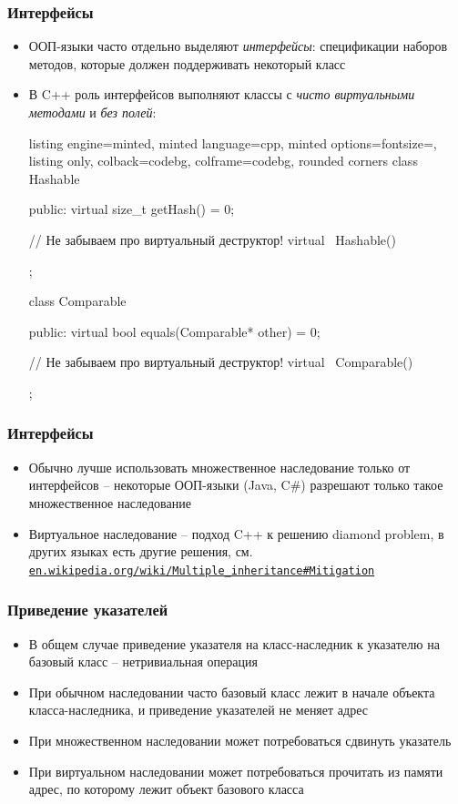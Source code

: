\documentclass[10pt]{beamer}
\begin{document}
\begin{frame}[fragile]
\frametitle{Интерфейсы}
\begin{itemize}
\item ООП-языки часто отдельно выделяют \textit{интерфейсы}: спецификации наборов методов, которые должен поддерживать некоторый класс
\pause
\item В C++ роль интерфейсов выполняют классы с \textit{чисто виртуальными методами} и \textit{без полей}:
\begin{tcblisting}{listing engine=minted, minted language=cpp, minted options={fontsize=\scriptsize}, listing only, colback=codebg, colframe=codebg, rounded corners}
class Hashable {
public:
  virtual size_t getHash() = 0;

  // Не забываем про виртуальный деструктор!
  virtual ~Hashable() {}
};

class Comparable {
public:
  virtual bool equals(Comparable* other) = 0;

  // Не забываем про виртуальный деструктор!
  virtual ~Comparable() {}
};
\end{tcblisting}
\end{itemize}
\end{frame}

\begin{frame}[fragile]
\frametitle{Интерфейсы}
\begin{itemize}
\item Обычно лучше использовать множественное наследование только от интерфейсов -- некоторые ООП-языки (Java, C\#) разрешают только такое множественное наследование
\pause
\item Виртуальное наследование -- подход C++ к решению diamond problem, в других языках есть другие решения, см. \href{https://en.wikipedia.org/wiki/Multiple\_inheritance\#Mitigation}{\nolinkurl{en.wikipedia.org/wiki/Multiple\_inheritance\#Mitigation}}
\end{itemize}
\end{frame}

\begin{frame}[fragile]
\frametitle{Приведение указателей}
\begin{itemize}
\item В общем случае приведение указателя на класс-наследник к указателю на базовый класс -- нетривиальная операция
\pause
\item При обычном наследовании часто базовый класс лежит в начале объекта класса-наследника, и приведение указателей не меняет адрес
\pause
\item При множественном наследовании может потребоваться сдвинуть указатель
\pause
\item При виртуальном наследовании может потребоваться прочитать из памяти адрес, по которому лежит объект базового класса
\end{itemize}
\end{frame}
\end{document}
